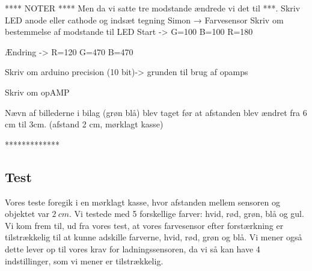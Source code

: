 **** NOTER ****
Men da vi satte tre modstande ændrede vi det til ***. 
Skriv LED anode eller cathode og indsæt tegning 
Simon → Farvesensor
Skriv om bestemmelse af modstande til LED
Start ->
G=100
B=100
R=180

Ændring ->
R=120
G=470
B=470

Skriv om arduino precision (10 bit)-> grunden til brug af opamps

Skriv om opAMP


Nævn af billederne i bilag (grøn blå) blev taget før at afstanden blev ændret fra 6 cm til 3cm.
(afstand 2 cm, mørklagt kasse)

*************
\subsection{Test}
Vores teste foregik i en mørklagt kasse, hvor afstanden mellem sensoren og objektet var $\SI{2}{cm}$. Vi testede med 5 forskellige farver: hvid, rød, grøn, blå og gul. Vi kom frem til, ud fra vores test, at vores farvesensor efter forstærkning er tilstrækkelig til at kunne adskille farverne, hvid, rød, grøn og blå. Vi mener også dette lever op til vores krav for ladningssensoren, da vi så kan have 4 indstillinger, som vi mener er tilstrækkelig.


